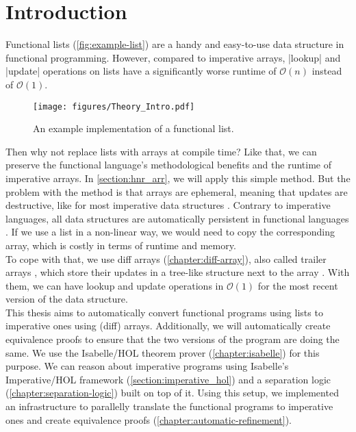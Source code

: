 \chapter{Introduction}\label{chapter:introduction}


Functional lists (\autoref{fig:example-list}) are a handy and easy-to-use data structure in functional programming. However, compared to imperative arrays, |lookup| and |update| operations on lists have a significantly worse runtime of $\mathcal{O}(n)$ instead of $\mathcal{O}(1)$. 

\begin{figure}[htpb]
\texttt{[image: figures/Theory\_Intro.pdf]}
\caption[Example functional list implementation]{An example implementation of a functional list.}\label{fig:example-list}
\end{figure}

\noindent Then why not replace lists with arrays at compile time? Like that, we can preserve the functional language's methodological benefits and the runtime of imperative arrays. In \autoref{section:hnr_arr}, we will apply this simple method. But the problem with the method is that arrays are ephemeral, meaning that updates are destructive, like for most imperative data structures \parencite[p.2]{Okasaki_1998}. Contrary to imperative languages, all data structures are automatically persistent in functional languages \parencite[p.2]{Okasaki_1998}.
If we use a list in a non-linear way, we would need to copy the corresponding array, which is costly in terms of runtime and memory. \\
To cope with that, we use diff arrays (\autoref{chapter:diff-array}), also called trailer arrays \parencite{Bloss1989}, which store their updates in a tree-like structure next to the array \parencite[p.706]{Kumar2017}. 
With them, we can have lookup and update operations in $\mathcal{O}(1)$ for the most recent version of the data structure. \\
This thesis aims to automatically convert functional programs using lists to imperative ones using (diff) arrays. Additionally, we will automatically create equivalence proofs to ensure that the two versions of the program are doing the same. We use the Isabelle/HOL theorem prover (\autoref{chapter:isabelle}) for this purpose. We can reason about imperative programs using Isabelle's Imperative/HOL framework (\autoref{section:imperative_hol}) and a separation logic (\autoref{chapter:separation-logic}) built on top of it. Using this setup, we implemented an infrastructure to parallelly translate the functional programs to imperative ones and create equivalence proofs (\autoref{chapter:automatic-refinement}).
